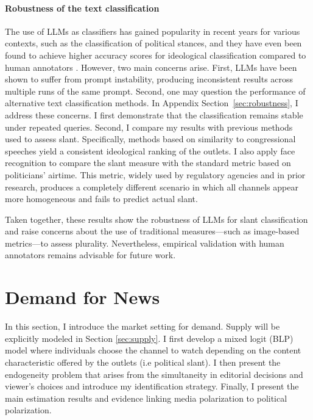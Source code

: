 \documentclass[12pt]{article}
\begin{document}
	
	
	
	
	
	
	
	
	\paragraph{Robustness of the text classification}
	
The use of LLMs as classifiers has gained popularity in recent years for various contexts, such as the classification of political stances, and they have even been found to achieve higher accuracy scores for ideological classification compared to human annotators \citep[see e.g.][]{lemens,tornberg2023,Gilardi2023ChatGPTOC}. However, two main concerns arise. First, LLMs have been shown to suffer from prompt instability, producing inconsistent results across multiple runs of the same prompt. Second, one may question the performance of alternative text classification methods. In Appendix Section~\ref{sec:robustness}, I address these concerns. I first demonstrate that the classification remains stable under repeated queries. Second, I compare my results with previous methods used to assess slant. Specifically, methods based on similarity to congressional speeches \citep{gentzkow2010media,laver2003extracting} yield a consistent ideological ranking of the outlets. I also apply face recognition to compare the slant measure with the standard metric based on politicians’ airtime. This metric, widely used by regulatory agencies and in prior research, produces a completely different scenario in which all channels appear more homogeneous and fails to predict actual slant.

Taken together, these results show the robustness of LLMs for slant classification and raise concerns about the use of traditional measures—such as image-based metrics—to assess plurality. Nevertheless, empirical validation with human annotators remains advisable for future work.

	
	

	
	
	\section{Demand for News}	\label{sec:demand}

In this section, I introduce the market setting for demand. Supply will be explicitly modeled in Section \ref{sec:supply}. I first develop a mixed logit (BLP) model \citep{berry_blp} where individuals choose the channel to watch depending on the content characteristic offered by the outlets (i.e political slant). I then present the endogeneity problem that arises from the simultaneity in editorial decisions and viewer's choices and introduce my identification strategy. Finally, I present the main estimation results and evidence linking media polarization to political polarization. 
\end{document}

